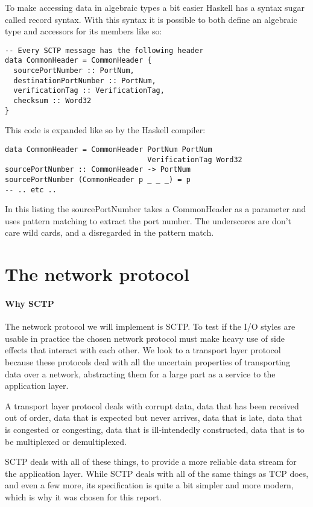 To make accessing data in algebraic types a bit easier Haskell has a syntax sugar called record syntax. With this syntax it is possible to both define an algebraic type and accessors for its members like so:
\begin{lstlisting}[caption={SCTP Common Header}]
-- Every SCTP message has the following header
data CommonHeader = CommonHeader {
  sourcePortNumber :: PortNum,
  destinationPortNumber :: PortNum,
  verificationTag :: VerificationTag,
  checksum :: Word32
}
\end{lstlisting}

This code is expanded like so by the Haskell compiler:

\begin{lstlisting}[caption={SCTP Common Header}]
data CommonHeader = CommonHeader PortNum PortNum
                                 VerificationTag Word32
sourcePortNumber :: CommonHeader -> PortNum
sourcePortNumber (CommonHeader p _ _ _) = p
-- .. etc ..
\end{lstlisting}

In this listing the sourcePortNumber takes a CommonHeader as a parameter and uses pattern matching to extract the port number. The underscores are don't care wild cards, and a disregarded in the pattern match.


\section{The network protocol}
\paragraph{Why SCTP}
The network protocol we will implement is SCTP.
To test if the I/O styles are usable in practice the chosen network protocol must make heavy use of side effects that interact with each other.
We look to a transport layer protocol because these protocols deal with all the uncertain properties of transporting data over a network, abstracting them for a large part as a service to the application layer.

A transport layer protocol deals with corrupt data, data that has been received out of order, data that is expected but never arrives, data that is late, data that is congested or congesting, data that is ill-intendedly constructed, data that is to be multiplexed or demultiplexed.

SCTP deals with all of these things, to provide a more reliable data stream for the application layer.
While SCTP deals with all of the same things as TCP does, and even a few more, its specification is quite a bit simpler and more modern, which is why it was chosen for this report.
